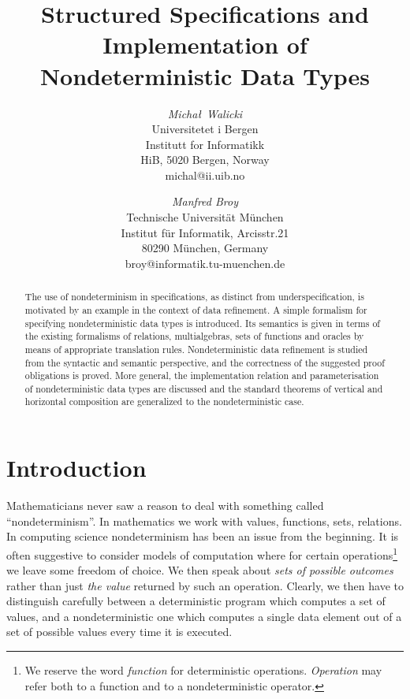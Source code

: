 


\title{Structured Specifications and Implementation of \\ Nondeterministic Data Types}
\author{{\em Micha{\l}\ Walicki} \\
\small Universitetet i Bergen \\[-.5ex] 
\small Institutt for Informatikk \\[-.5ex] 
\small HiB, 5020 Bergen, Norway \\[-.5ex] {\scriptsize michal@ii.uib.no} 
\and {\em Manfred Broy} \\
\small Technische Universit\"{a}t M\"{u}nchen \\[-.5ex] 
\small Institut f\"{u}r Informatik, Arcisstr.21 \\[-.5ex] 
\small 80290 M\"{u}nchen, Germany \\[-.5ex] {\scriptsize broy@informatik.tu-muenchen.de} }
\date{}
\maketitle
\begin{abstract}\noindent The use of nondeterminism in specifications, as distinct from underspecification, is
motivated by an example in the context of data refinement. A simple formalism for specifying nondeterministic data types is introduced. Its semantics is given in terms of the existing formalisms of relations, multialgebras, sets of
functions and oracles by means of appropriate translation rules. Nondeterministic data refinement is studied from the syntactic and semantic perspective, and the correctness of the suggested proof obligations is proved.
More general, the implementation relation and parameterisation of nondeterministic data types are discussed and the standard theorems of vertical and horizontal composition are generalized to the
nondeterministic case.
\end{abstract}

\section{Introduction}
Mathematicians never saw a reason to deal with something called ``nondeterminism''. In mathematics we work with values, functions, sets, relations.
In computing science nondeterminism has been an issue from the beginning. 
It is often suggestive to consider models of computation where for certain operations\footnote{We reserve the word {\em function} for deterministic operations. {\em Operation} may refer both to a function and
to a nondeterministic operator.} we leave some freedom of choice. We then speak
about {\em sets of possible outcomes} rather than just {\em the value} returned
by
such an operation. Clearly, we then have to distinguish carefully between a deterministic program which computes a set of values, and a nondeterministic one which computes a single data element out of a set of possible values every time it is executed. 

